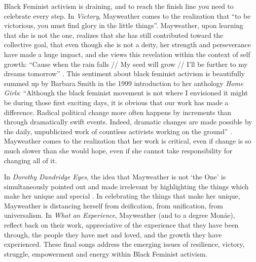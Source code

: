\documentclass[a4paper, 11pt]{article} %
\begin{document}
Black Feminist activism is draining, and to reach the finish line you need to celebrate every step.
In \emph{Victory}, Mayweather comes to the realization that ``to be victorious, you must find glory in the little things''\cite{victory}.
Mayweather, upon learning that she is not the one, realizes that she has still contributed toward the collective goal, that even though she is not a deity, her strength and perseverance have made a huge impact, and she views this revelation within the context of self growth: 
 ``Cause when the rain falls // My seed will grow // I'll be further to my dreams tomorrow'' \cite{victory}.
 This sentiment about black feminist activism is beautifully summed up by Barbara Smith in the 1999 introduction to her anthology \emph{Home Girls}:
 ``Although the black feminist movement is not where I envisioned it might be during those first exciting days, it is obvious that our work has made a difference. Radical political change more often happens by increments than through dramatically swift events. Indeed, dramatic changes are made possible by the daily, unpublicized work of countless activists working on the ground'' \cite{smithhomegirls}.
 Mayweather comes to the realization that her work is critical, even if change is so much slower than she would hope, even if she cannot take responsibility for changing all of it.
 
 In \emph{Dorothy Dandridge Eyes}, the idea that Mayweather is not `the One' is simultaneously pointed out and made irrelevant by highlighting the things which make her unique and special \cite{dandridgeeyes}.
 In celebrating the things that make her unique, Mayweather is distancing herself from deification, from unification, from universalism.
 In \emph{What an Experience}, Mayweather (and to a degree Mon\'ae), reflect back on their work, appreciative of the experience that they have been through, the people they have met and loved, and the growth they have experienced. 
 These final songs address the emerging issues of resilience, victory, struggle, empowerment and energy within Black Feminist activism.

\end{document}
